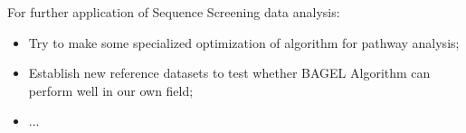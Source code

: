 \documentclass[fleqn,10pt]{wlscirep}
\begin{document}
For further application of Sequence Screening data analysis:
\begin{itemize}
    \item Try to make some specialized optimization of algorithm for pathway analysis;
    \item Establish new reference datasets to test whether BAGEL Algorithm can perform well in our own field;
    \item ...
\end{itemize}


\end{document}
